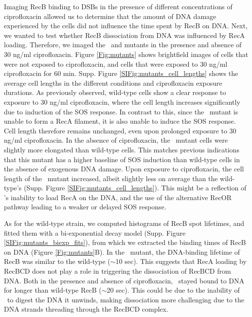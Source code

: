Imaging RecB binding to DSBs in the presence of different concentrations of ciprofloxacin allowed us to determine that the amount of DNA damage experienced by the cells did not influence the time spent by RecB on DNA. Next, we wanted to test whether RecB dissociation from DNA was influenced by RecA loading. Therefore, we imaged the \dreca\ and \teneighty mutants in the presence and absence of 30 ng/ml ciprofloxacin. Figure \ref{Fig:mutants} shows brightfield images of cells that were not exposed to ciprofloxacin, and cells that were exposed to 30 ng/ml ciprofloxacin for 60 min. Supp. Figure \ref{SIFig:mutants_cell_lengths} shows the average cell lengths in the different conditions and ciprofloxacin exposure durations. As previously observed, wild-type cells show a clear response to exposure to 30 ng/ml ciprofloxacin, where the cell length increases significantly due to induction of the SOS response. In contrast to this, since the \dreca\ mutant is unable to form a RecA filament, it is also unable to induce the SOS response. Cell length therefore remains unchanged, even upon prolonged exposure to 30 ng/ml ciprofloxacin. In the absence of ciprofloxacin, the \teneighty\ mutant cells were slightly more elongated than wild-type cells. This matches previous indications that this mutant has a higher baseline of SOS induction than wild-type cells in the absence of exogenous DNA damage.\cite{Lepore2023} Upon exposure to ciprofloxacin, the cell length of the \teneighty\ mutant increased, albeit slightly less on average than the wild-type's (Supp. Figure \ref{SIFig:mutants_cell_lengths}). This might be a reflection of \teneighty's inability to load RecA on the DNA, and the use of the alternative RecOR pathway leading to a weaker or delayed SOS response.\cite{Ivancic-Bace_2003,Lepore2023}

As for the wild-type strain, we computed histograms of RecB spot lifetimes, and fitted them with a bi-exponential decay model (Supp. Figure \ref{SIFig:mutants_biexp_fits}), from which we extracted the binding times of RecB on DNA (Figure \ref{Fig:mutants}B). In the \dreca\ mutant, the DNA-binding lifetime of RecB was similar to the wild-type ($\sim$10 sec). This suggests that RecA loading by RecBCD does not play a role in triggering the dissociation of RecBCD from DNA. Both in the presence and absence of ciprofloxacin, \teneighty\ stayed bound to DNA for longer than wild-type RecB ($\sim$20 sec). This could be due to the inability of \teneighty\ to digest the DNA it unwinds, making dissociation more challenging due to the DNA strands threading through the RecBCD complex.

